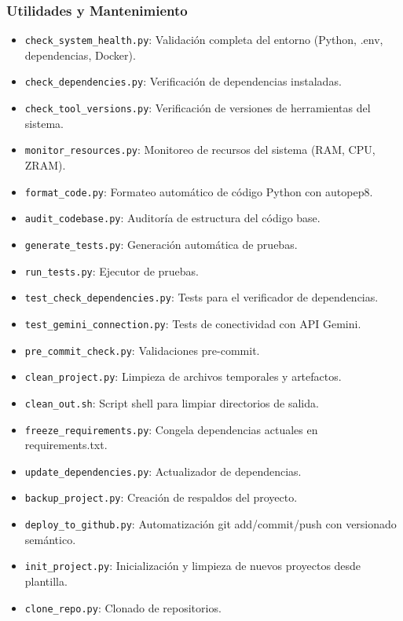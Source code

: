 \documentclass[12pt, a4paper]{article}
\begin{document}
\subsubsection*{Utilidades y Mantenimiento}
\begin{itemize}[leftmargin=*]
    \item \texttt{check\_system\_health.py}: Validación completa del entorno (Python, .env, dependencias, Docker).
    \item \texttt{check\_dependencies.py}: Verificación de dependencias instaladas.
    \item \texttt{check\_tool\_versions.py}: Verificación de versiones de herramientas del sistema.
    \item \texttt{monitor\_resources.py}: Monitoreo de recursos del sistema (RAM, CPU, ZRAM).
    \item \texttt{format\_code.py}: Formateo automático de código Python con autopep8.
    \item \texttt{audit\_codebase.py}: Auditoría de estructura del código base.
    \item \texttt{generate\_tests.py}: Generación automática de pruebas.
    \item \texttt{run\_tests.py}: Ejecutor de pruebas.
    \item \texttt{test\_check\_dependencies.py}: Tests para el verificador de dependencias.
    \item \texttt{test\_gemini\_connection.py}: Tests de conectividad con API Gemini.
    \item \texttt{pre\_commit\_check.py}: Validaciones pre-commit.
    \item \texttt{clean\_project.py}: Limpieza de archivos temporales y artefactos.
    \item \texttt{clean\_out.sh}: Script shell para limpiar directorios de salida.
    \item \texttt{freeze\_requirements.py}: Congela dependencias actuales en requirements.txt.
    \item \texttt{update\_dependencies.py}: Actualizador de dependencias.
    \item \texttt{backup\_project.py}: Creación de respaldos del proyecto.
    \item \texttt{deploy\_to\_github.py}: Automatización git add/commit/push con versionado semántico.
    \item \texttt{init\_project.py}: Inicialización y limpieza de nuevos proyectos desde plantilla.
    \item \texttt{clone\_repo.py}: Clonado de repositorios.

\end{itemize}
\end{document}
